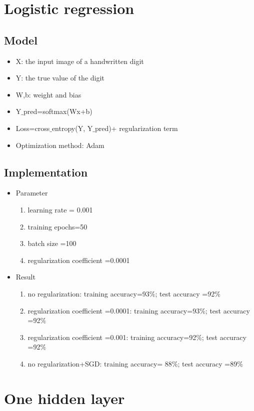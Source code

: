 \documentclass[12pt]{article}
\begin{document}
\begin{CJK*}{UTF8}{gbsn}
\section{Logistic regression }
\subsection{Model}
\begin{itemize}
\item X: the input image of a handwritten digit
\item Y: the true value of the digit
\item W,b: weight and bias
\item Y$\_$pred=softmax(Wx+b)
\item Loss=cross$\_$entropy(Y, Y$\_$pred)+ regularization term
\item Optimization method: Adam
\end{itemize}

\subsection{Implementation }
\begin{itemize}
\item Parameter
\begin{enumerate}
\item learning rate = 0.001
\item training epochs=50
\item batch size =100
\item regularization coefficient =0.0001
\end{enumerate}
\item Result
\begin{enumerate}
\item no regularization: training accuracy=93$\%$; test accuracy =92$\%$
\item regularization coefficient =0.0001: training accuracy=93$\%$; test accuracy =92$\%$
\item regularization coefficient =0.001: training accuracy=92$\%$; test accuracy =92$\%$
\item no regularization+SGD: training accuracy= 88$\%$; test accuracy =89$\%$
\end{enumerate}

\end{itemize}

\section{One hidden layer }

\end{CJK*}
\end{document}
